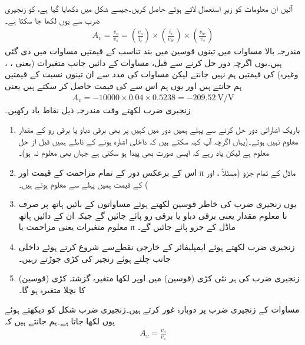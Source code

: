 آئیں ان معلومات کو زیرِ استعمال لاتے ہوئے  حاصل کریں۔جیسے شکل   میں دکھایا گیا ہے،  کو زنجیری ضرب سے یوں لکھا جا سکتا ہے۔
\begin{align} \label{مساوات_ٹرانزسٹر_زنجیری_ضرب_مثال_الف}
A_v =\frac{v_o}{v_s}= \left (\frac{v_o}{i_c} \right) \times \left (\frac{i_c}{v_{be}} \right)   \times \left (\frac{v_{be}}{v_s} \right) 
\end{align}
مندرجہ بالا مساوات میں تینوں قوسین میں بند تناسب کے قیمتیں مساوات   میں دی گئی ہیں۔یوں اگرچہ دور حل کرنے سے قبل، مساوات   کے دائیں جانب متغیرات (یعنی ، ،  وغیرہ) کی قیمتیں ہم نہیں جانتے لیکن مساوات   کی مدد سے ان تینوں نسبت کے قیمتیں ہم جانتے ہیں اور یوں ہم اس سے  کی قیمت حاصل کر سکتے ہیں یعنی
\begin{align}
A_v = -10000  \times 0.04  \times 0.5238 =\SI[per=frac,fraction=nice]{-209.52}{\volt \per \volt}
\end{align}
	زنجیری ضرب لکھتے وقت مندرجہ ذیل نقاط یاد رکھیں۔
\begin{enumerate}
\item
باریک اشاراتی دور حل کرنے سے پہلے ہمیں دور میں کہیں پر بھی برقی دباو یا برقی رو کے مقدار معلوم نہیں ہوتے۔(یہاں اگرچہ آپ کہہ سکتے ہیں کہ  داخلی اشارہ ہونے کے ناطے ہمیں قبل از حل معلوم ہے لیکن یاد رہے کہ ایسی صورت بھی پیدا ہو سکتی ہے جہاں  بھی معلوم نہ ہو)۔
\item
اس کے برعکس دور کے تمام مزاحمت کے قیمت اور π ماڈل کے تمام جزو  (مسئلاً  ،  اور  ) کے قیمت ہمیں پہلے سے معلوم ہوتے ہیں۔
\item
یوں زنجیری ضرب کی خاطر قوسین لکھتے ہوئے مساواتوں کے بائیں ہاتھ پر صرف نا معلوم مقدار یعنی برقی دباو یا برقی رو پائے جائیں گے جبکہ ان کے دائیں ہاتھ معلوم متغیرات یعنی مزاحمت یا π ماڈل کے جزو پائے جائیں گے۔
\item
زنجیری ضرب لکھتے ہوئے ایمپلیفائر کے خارجی نقطےسے شروع کرتے ہوئے داخلی جانب چلتے ہوئے زنجیر کی کڑی جوڑتے رہیں۔
\item
زنجیری ضرب کی ہر نئی کڑی (قوسین) میں اوپر لکھا متغیرہ گزشتہ کڑی (قوسین) کا 	نچلا متغیرہ ہو گا۔
\end{enumerate}
	مساوات   کے زنجیری ضرب پر دوبارہ غور کرتے ہیں۔زنجیری ضرب شکل   کو دیکھتے ہوئے یوں لکھا جاتا ہے۔ہم جانتے ہیں کہ
\begin{align*}
A_v=\frac{v_o}{v_s}
\end{align*}
